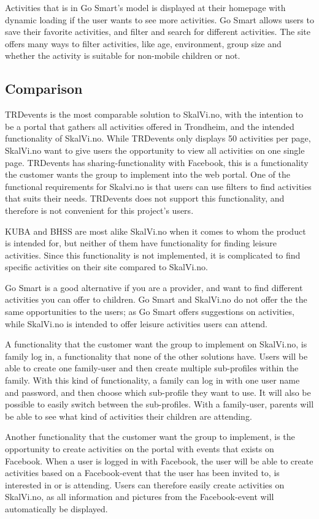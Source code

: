 Activities that is in Go Smart's model is displayed at their homepage with dynamic loading if the user wants to see more activities. Go Smart allows users to save their favorite activities, and filter and search for different activities. The site offers many ways to filter activities, like age, environment, group size and whether the activity is suitable for non-mobile children or not.

\subsection{Comparison}
TRDevents is the most comparable solution to SkalVi.no, with the intention to be a portal that gathers all activities offered in Trondheim, and  the intended functionality of SkalVi.no. While TRDevents only displays 50 activities per page, SkalVi.no want to give users the opportunity to view all activities on one single page. TRDevents has sharing-functionality with Facebook, this is a functionality the customer wants the group to implement into the web portal. One of the functional requirements for Skalvi.no is that users can use filters to find activities that suits their needs. TRDevents does not support this functionality, and therefore is not convenient for this project's users. 

KUBA and BHSS are most alike SkalVi.no when it comes to whom the product is intended for, but neither of them have functionality for finding leisure activities. Since this functionality is not implemented, it is complicated to find specific activities on their site compared to SkalVi.no.

Go Smart is a good alternative if you are a provider, and want to find different activities you can offer to children. Go Smart and SkalVi.no do not offer the the same opportunities to the users; as Go Smart offers suggestions on activities, while SkalVi.no is intended to offer leisure activities users can attend.

A functionality that the customer want the group to implement on SkalVi.no, is family log in, a functionality that none of the other solutions have. Users will be able to create one family-user and then create multiple sub-profiles within the family. With this kind of functionality, a family can log in with one user name and password, and then choose which sub-profile they want to use. It will also be possible to easily switch between the sub-profiles. With a family-user, parents will be able to see what kind of activities their children are attending. 

Another functionality that the customer want the group to implement, is the opportunity to create activities on the portal with events that exists on Facebook. When a user is logged in with Facebook, the user will be able to create activities based on a Facebook-event that the user has been invited to, is interested in or is attending. Users can therefore easily create activities on SkalVi.no, as all information and pictures from the Facebook-event will automatically be displayed.

\cleardoublepage